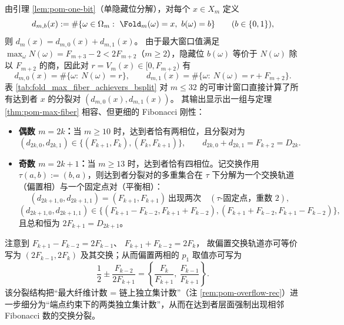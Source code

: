 \begin{remark}\label{rem:pom-max-fiber-achievers-bsplit}
由引理 \ref{lem:pom-one-bit}（单隐藏位分解），对每个 \(x\in X_m\) 定义
\[
d_{m,b}(x):=\#\{\omega\in\Omega_m:\ \Fold_m(\omega)=x,\ b(\omega)=b\}\qquad(b\in\{0,1\}),
\]
则 \(d_m(x)=d_{m,0}(x)+d_{m,1}(x)\)。
由于最大窗口值满足 \(\max_{\omega}N(\omega)=F_{m+3}-2<2F_{m+2}\)（\(m\ge 2\)），隐藏位 \(b(\omega)\) 等价于 \(N(\omega)\) 除以 \(F_{m+2}\) 的商，因此对 \(r=V_m(x)\in[0,F_{m+2})\) 有
\[
d_{m,0}(x)=\#\{\omega:\ N(\omega)=r\},\qquad
d_{m,1}(x)=\#\{\omega:\ N(\omega)=r+F_{m+2}\}.
\]
表 \ref{tab:fold_max_fiber_achievers_bsplit} 对 \(m\le 32\) 的可审计窗口直接计算了所有达到者 \(x\) 的分裂对 \((d_{m,0}(x),d_{m,1}(x))\)。
其输出显示出一组与定理 \ref{thm:pom-max-fiber} 相容、但更细的 Fibonacci 刚性：
\begin{itemize}
  \item \textbf{偶数 \(m=2k\)：}当 \(m\ge 10\) 时，达到者恰有两相位，且分裂对为
  \[
  (d_{2k,0},d_{2k,1})\in\{(F_{k+1},F_k),(F_k,F_{k+1})\},\qquad d_{2k,0}+d_{2k,1}=F_{k+2}=D_{2k}.
  \]
  \item \textbf{奇数 \(m=2k+1\)：}当 \(m\ge 13\) 时，达到者恰有四相位。记交换作用 \(\tau(a,b):=(b,a)\)，则达到者分裂对的多重集合在 \(\tau\) 下分解为一个交换轨道（偏置相）与一个固定点对（平衡相）：
  \[
  (d_{2k+1,0},d_{2k+1,1})=(F_{k+1},F_{k+1})\ \text{出现两次}\quad(\tau\text{-固定点，重数 }2),
  \]
  \[
  (d_{2k+1,0},d_{2k+1,1})\in\{(F_{k+1}-F_{k-2},F_{k+1}+F_{k-2}),(F_{k+1}+F_{k-2},F_{k+1}-F_{k-2})\},
  \]
  且总和恒为 \(2F_{k+1}=D_{2k+1}\)。
\end{itemize}
注意到
\(
F_{k+1}-F_{k-2}=2F_{k-1}
\)、
\(
F_{k+1}+F_{k-2}=2F_{k}
\)，
故偏置交换轨道亦可等价写为 \((2F_{k-1},2F_k)\) 及其交换；从而偏置两相的 \(p_1\) 取值亦可写为
\[
\frac12\pm\frac{F_{k-2}}{2F_{k+1}}
=\left\{\frac{F_k}{F_{k+1}},\ \frac{F_{k-1}}{F_{k+1}}\right\}.
\]
该分裂结构把“最大纤维计数 = 链上独立集计数”（注 \ref{rem:pom-overflow-rec}）进一步细分为“端点约束下的两类独立集计数”，从而在达到者层面强制出现相邻 Fibonacci 数的交换分裂。
\end{remark}


